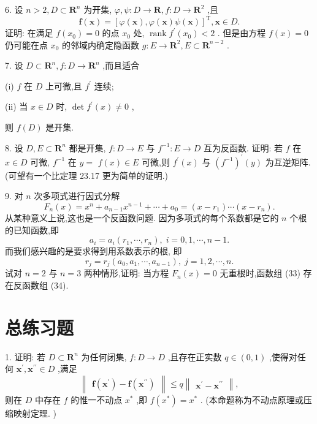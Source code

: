 6. 设 \(n > 2,D \subset  {\mathbf{R}}^{n}\) 为开集, \(\varphi ,\psi  : D \rightarrow  \mathbf{R},f : D \rightarrow  {\mathbf{R}}^{2}\) ,且
\[
\mathbf{f}\left( \mathbf{x}\right)  = {\left\lbrack  \varphi \left( \mathbf{x}\right) ,\varphi \left( \mathbf{x}\right) \psi \left( \mathbf{x}\right) \right\rbrack  }^{\mathrm{T}},\mathbf{x} \in  D.
\]
证明: 在满足 \(f\left( {x}_{0}\right)  = 0\) 的点 \({x}_{0}\) 处, \(\operatorname{rank}{f}^{\prime }\left( {x}_{0}\right)  < 2\) . 但是由方程 \(f\left( x\right)  = 0\) 仍可能在点 \({x}_{0}\) 的邻域内确定隐函数 \(g : E \rightarrow  {\mathbf{R}}^{2},E \subset  {\mathbf{R}}^{n - 2}\) .

7. 设 \(D \subset  {\mathbf{R}}^{n},f : D \rightarrow  {\mathbf{R}}^{n}\) ,而且适合

(i) \(f\) 在 \(D\) 上可微,且 \({f}^{\prime }\) 连续;

(ii) 当 \(x \in  D\) 时, \(\det {f}^{\prime }\left( x\right)  \neq  0\) ,

则 \(f\left( D\right)\) 是开集.

8. 设 \(D,E \subset  {\mathbf{R}}^{n}\) 都是开集, \(f : D \rightarrow  E\) 与 \({f}^{-1} : E \rightarrow  D\) 互为反函数. 证明: 若 \(f\) 在 \(x \in  D\) 可微, \({f}^{-1}\) 在 \(y =\)  \(f\left( x\right)  \in  E\) 可微,则 \({f}^{\prime }\left( x\right)\) 与 \({\left( {f}^{-1}\right) }^{\prime }\left( y\right)\) 为互逆矩阵. (可望有一个比定理 23.17 更为简单的证明.)

9. 对 \(n\) 次多项式进行因式分解
\[
{F}_{n}\left( x\right)  = {x}^{n} + {a}_{n - 1}{x}^{n - 1} + \cdots  + {a}_{0} = \left( {x - {r}_{1}}\right) \cdots \left( {x - {r}_{n}}\right) .
\]
从某种意义上说,这也是一个反函数问题. 因为多项式的每个系数都是它的 \(n\) 个根的已知函数,即
\[
{a}_{i} = {a}_{i}\left( {{r}_{1},\cdots ,{r}_{n}}\right) ,\;i = 0,1,\cdots ,n - 1. \tag{33}
\]
而我们感兴趣的是要求得到用系数表示的根, 即
\[
{r}_{j} = {r}_{j}\left( {{a}_{0},{a}_{1},\cdots ,{a}_{n - 1}}\right) ,\;j = 1,2,\cdots ,n. \tag{34}
\]
试对 \(n = 2\) 与 \(n = 3\) 两种情形,证明: 当方程 \({F}_{n}\left( x\right)  = 0\) 无重根时,函数组 (33) 存在反函数组 (34).

\section{总练习题}

1. 证明: 若 \(D \subset  {\mathbf{R}}^{n}\) 为任何闭集, \(f : D \rightarrow  D\) ,且存在正实数 \(q \in  \left( {0,1}\right)\) ,使得对任何 \({\mathbf{x}}^{\prime },{\mathbf{x}}^{\prime \prime } \in  D\) ,满足
\[
\begin{Vmatrix}{\mathbf{f}\left( {\mathbf{x}}^{\prime }\right)  - \mathbf{f}\left( {\mathbf{x}}^{\prime \prime }\right) }\end{Vmatrix} \leq  q\begin{Vmatrix}{{\mathbf{x}}^{\prime } - {\mathbf{x}}^{\prime \prime }}\end{Vmatrix},
\]
则在 \(D\) 中存在 \(f\) 的惟一不动点 \({x}^{ * }\) ,即 \(f\left( {x}^{ * }\right)  = {x}^{ * }\) . (本命题称为不动点原理或压缩映射定理. )

